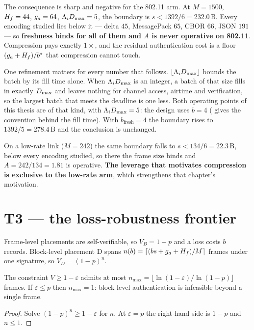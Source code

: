 The consequence is sharp and negative for the 802.11 arm. At $M = 1500$, $H_f = 44$, $g_a = 64$,
$\Lambda_i D_{\max} = 5$, the boundary is $s < 1392/6 = 232.0$\,B. Every encoding studied lies below
it --- delta $45$, MessagePack $65$, CBOR $66$, JSON $191$ --- so \textbf{freshness binds for all
of them and $A$ is never operative on 802.11}. Compression pays exactly $1\times$, and the
residual authentication cost is a floor $(g_a + H_f)/b^\star$ that compression cannot touch.

One refinement matters for every number that follows. $\lfloor \Lambda_i D_{\max} \rfloor$ bounds
the batch by its fill time alone. When $\Lambda_i D_{\max}$ is an integer, a batch of that size fills
in exactly $D_{\max}$ and leaves nothing for channel access, airtime and verification, so the largest
batch that meets the deadline is one less. Both operating points of this thesis are of that kind,
with $\Lambda_i D_{\max} = 5$: the design uses $b = 4$ ( gives the
convention behind the fill time). With $b_{\mathrm{fresh}} = 4$ the boundary rises to
$1392/5 = 278.4$\,B and the conclusion is unchanged.

On a low-rate link ($M = 242$) the same boundary falls to $s < 134/6 = 22.3$\,B, below every
encoding studied, so there the frame size binds and $A = 242/134 = 1.81$ is operative.
\textbf{The leverage that motivates compression is exclusive to the low-rate arm}, which
strengthens that chapter's motivation.

\section{T3 --- the loss-robustness frontier}

Frame-level placements are self-verifiable, so $V_B = 1-p$ and a loss costs $b$ records.
Block-level placement D spans $n(b) = \lceil (bs + g_a + H_f)/M \rceil$ frames under one signature,
so $V_D = (1-p)^n$.

\begin{theorem}\label{thm:t3}
The constraint $V \geq 1-\varepsilon$ admits at most
$n_{\max} = \lfloor \ln(1-\varepsilon)/\ln(1-p) \rfloor$ frames. If $\varepsilon \leq p$ then
$n_{\max} = 1$: block-level authentication is infeasible beyond a single frame.
\end{theorem}

\begin{proof}
Solve $(1-p)^n \geq 1-\varepsilon$ for $n$. At $\varepsilon = p$ the right-hand side is $1-p$ and
$n \leq 1$.
\end{proof}

